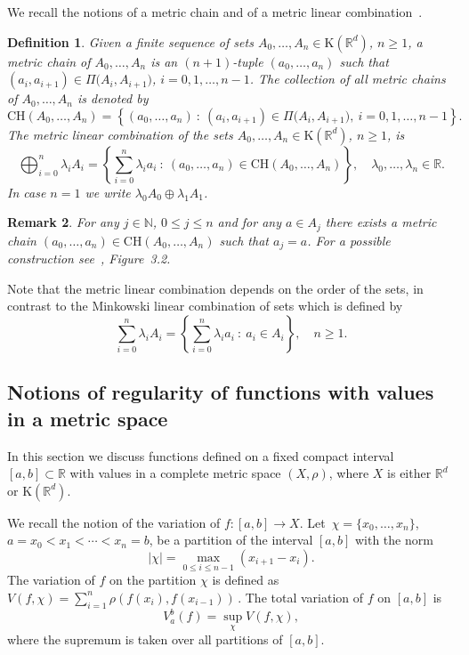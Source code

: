 \documentclass[final,3p,mathptmx]{article}%
\newcommand{\R}{{\mathbb R}}
\newcommand{\N}{{\mathbb N}}
\newcommand{\Rd}{{\R}^d}
\newcommand{\Comp}{\mathrm{K}(\Rd)}
\newcommand{\CH}{{\mathrm{CH}}}
\newcommand{\Pair}[2]{\Pi \big ( {#1},{#2} \big )}
\newtheorem{remark}{Remark}[section]
\newtheorem{defin}[remark]{Definition}
\begin{document}
{{{{%

We recall the notions of  a metric chain and of a metric linear combination~\cite{DFM:MetricIntegral}.
\begin{defin}\label{Def_MetChain_MetCombination} \cite{DFM:MetricIntegral}
	Given a finite sequence of sets $A_0, \ldots, A_n \in \Comp$, $n \ge 1$,  a metric chain of $A_0, \ldots, A_n$ is an $(n+1)$-tuple $(a_0,\ldots,a_n)$ such that $(a_i,a_{i+1}) \in \Pair {A_i}{A_{i+1}}$, $i=0,1,\ldots,n-1$. The collection of all metric chains of $A_0, \ldots, A_n$ is denoted by  
	$$
	\CH(A_0,\ldots,A_n)= \left\{ (a_0,\ldots,a_n) \ : \ (a_i,a_{i+1}) \in \Pair {A_i}{A_{i+1}}, \  i=0,1,\ldots,n-1 \right\}.
	$$
	The metric linear combination of the sets $A_0, \ldots, A_n \in \Comp$, $n \ge 1$, is
	$$
	\bigoplus_{i=0}^n \lambda_i A_i =
	\left\{ \sum_{i=0}^n \lambda_i a_i \ : \ (a_0,\ldots,a_n) \in \CH(A_0,\ldots,A_n) \right\}, \quad \lambda_0,\ldots,\lambda_n \in \R.
	$$
	In case $n=1$ we write $\lambda_0 A_0 \oplus \lambda_1 A_1$. 
\end{defin}


\begin{remark}\label{Remar_ThereIsChain}
	For any $j\in \N$,  $0 \le j\le n$ and for any $a \in A_j$ there exists a metric chain $(a_0, \ldots, a_n) \in \CH(A_0,\ldots,A_n)$ such that $a_j=a$. For a possible construction see~\cite{DFM:Chains}, Figure~3.2.
\end{remark}

Note that the metric linear combination depends on the order of the sets, in contrast to the Minkowski linear combination of sets which is defined by
$$
\sum_{i=0}^n \lambda_i A_i =
\left\{ \sum_{i=0}^n \lambda_i a_i \ : \  a_i \in A_i \right\},\quad n \ge 1.
$$

\subsection {Notions of regularity of functions with values in a metric space}\label{Sect_Prelim_Regularuty}
In this section we discuss functions defined on a fixed compact interval $[a,b] \subset \R$ with values in a complete metric space $(X,\rho)$, where $X$ is either $\Rd$ or $\Comp$. 

We recall the notion of the variation of ${f:[a,b]\rightarrow X}$. Let ${\, \chi=\{x_0,\ldots, x_n\} }$, $a=x_0 < x_1 < \cdots <x_n=b$, be a partition of the interval $[a,b]$ with the norm 
$$
{\displaystyle |\chi|=\max_{0\le i\le n-1} (x_{i+1}-x_i)}.
$$ 
The variation of $f$ on the partition $\chi$ is defined as 
$
V(f,\chi) = \sum_{i=1}^{n} \rho(f(x_i),f(x_{i-1}))\, .
$
The total variation of $f$ on $[a,b]$ is 
$$
V_{a}^{b}(f) = \sup_{\chi} V(f,\chi),
$$
where the supremum is taken over all partitions of $[a,b]$.

}}}}
\end{document}
